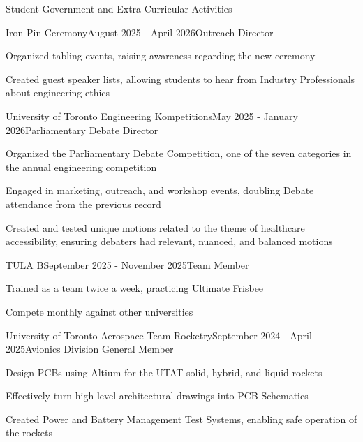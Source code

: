 \documentclass{resume}
\begin{document}
\begin{rSection}{Student Government and Extra-Curricular Activities}

\begin{rSubsection}{Iron Pin Ceremony}{August 2025 - April 2026}{Outreach Director}{}
\item Organized tabling events, raising awareness regarding the new ceremony
\item Created guest speaker lists, allowing students to hear from Industry Professionals about engineering ethics
\end{rSubsection}


\begin{rSubsection}{University of Toronto Engineering Kompetitions}{May 2025 - January 2026}{Parliamentary Debate Director}{}
\item Organized the Parliamentary Debate Competition, one of the seven categories in the annual engineering competition
\item Engaged in marketing, outreach, and workshop events, doubling Debate attendance from the previous record
\item Created and tested unique motions related to the theme of healthcare accessibility, ensuring debaters had relevant, nuanced, and balanced motions
\end{rSubsection}


\begin{rSubsection}{TULA B}{September 2025 - November 2025}{Team Member}{}
\item Trained as a team twice a week, practicing Ultimate Frisbee
\item Compete monthly against other universities
\end{rSubsection}


\begin{rSubsection}{University of Toronto Aerospace Team Rocketry}{September 2024 - April 2025}{Avionics Division General Member}{}
\item Design PCBs using Altium for the UTAT solid, hybrid, and liquid rockets
\item Effectively turn high-level architectural drawings into PCB Schematics
\item Created Power and Battery Management Test Systems, enabling safe operation of the rockets
\end{rSubsection}


\end{rSection}
\end{document}
